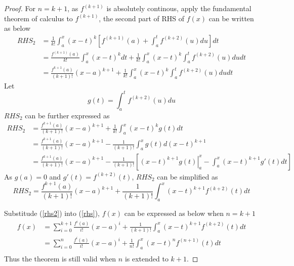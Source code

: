 \documentclass[paper=a4, fontsize=11pt]{scrartcl} %
\numberwithin{equation}{section} %
\numberwithin{figure}{section} %
\numberwithin{table}{section} %
\begin{document}
\begin{enumerate}
\begin{proof}
				For $n = k+1$, as $f^{(k+1)}$ is absolutely continous, apply the fundamental theorem of calculus to $f^{(k+1)}$, the second part of RHS of $f(x)$ can be written as below
				\begin{equation}
					\begin{aligned}
						RHS_2 & = \frac{1}{k!}\int_{a}^{x} (x-t)^k [f^{(k+1)}(a) + \int_{a}^{t}f^{(k+2)}(u) du] dt\\
						           & = \frac{f^{(k+1)}(a)}{k!}\int_{a}^{x}(x-t)^k dt + \frac{1}{k!}\int_{a}^{x}(x-t)^k \int_{a}^{t} f^{(k+2)}(u) du dt\\
						           & =  \frac{f^{k+1}(a)}{(k+1)!}(x-a)^{k+1} + \frac{1}{k!}\int_{a}^{x}(x-t)^k \int_{a}^{t} f^{(k+2)}(u) du dt
					\end{aligned}
				\end{equation}
				Let
				\begin{equation}
					g(t) = \int_{a}^{t} f^{(k+2)}(u) du
				\end{equation}
				$RHS_2$ can be further expressed as
				\begin{equation}
					\begin{aligned}
						RHS_2 & =  \frac{f^{k+1}(a)}{(k+1)!}(x-a)^{k+1} + \frac{1}{k!}\int_{a}^{x}(x-t)^k g(t) dt\\
								   & =  \frac{f^{k+1}(a)}{(k+1)!}(x-a)^{k+1} - \frac{1}{(k+1)!}\int_{a}^{x} g(t) d(x-t)^{k+1}\\
								   & =  \frac{f^{k+1}(a)}{(k+1)!}(x-a)^{k+1} - \frac{1}{(k+1)!}[\left. (x-t)^{k+1} g(t) \right|_{a}^{x} - \int_{a}^{x}(x-t)^{k+1} g'(t) dt]
					\end{aligned}
				\end{equation}
				As $g(a) = 0$ and $g'(t) = f^{(k+2)}(t)$, $RHS_2$ can be simplified as 
				\begin{equation}
					RHS_2 = \frac{f^{k+1}(a)}{(k+1)!}(x-a)^{k+1} + \frac{1}{(k+1)!}\int_{a}^{x}(x-t)^{k+1}  f^{(k+2)}(t)dt \label{rhs2}
				\end{equation}
				
				Substitude (\ref{rhs2}) into (\ref{rhs}), $f(x)$ can be expressed as below when $n = k+1$
				\begin{equation}
					\begin{aligned}
						f(x) & = \sum_{i=0}^{k+1}\frac{f^{i}(a)}{i!}(x-a)^i + \frac{1}{(k+1)!}\int_{a}^{x} (x-t)^{k+1} f^{(k+2)}(t) dt\\
						      & = \sum_{i=0}^{n}\frac{f^{i}(a)}{i!}(x-a)^i + \frac{1}{n!}\int_{a}^{x} (x-t)^{n} f^{(n+1)}(t) dt\\
					\end{aligned}
				\end{equation}
				Thus the theorem is still valid when $n$ is extended to $k+1$.
			\end{proof}


\end{enumerate}
\end{document}
